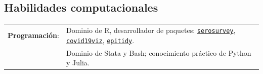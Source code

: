 \documentclass[margin,line]{res}
\begin{document}
\begin{resume}
\section{\sc Habilidades computacionales}
\begin{tabular}{ l l}
	{\bf Programación}: & Dominio de R, desarrollador de paquetes: %
	\href{https://avallecam.github.io/serosurvey/}{\texttt{serosurvey}}, 
	\href{https://avallecam.github.io/covid19viz/}{\texttt{covid19viz}},
	\href{https://github.com/avallecam/epitidy/}{\texttt{epitidy}}.
	\\ 
	& Dominio de Stata y Bash; conocimiento práctico de Python y Julia.\\ %
\end{tabular}


\end{resume}
\end{document}
